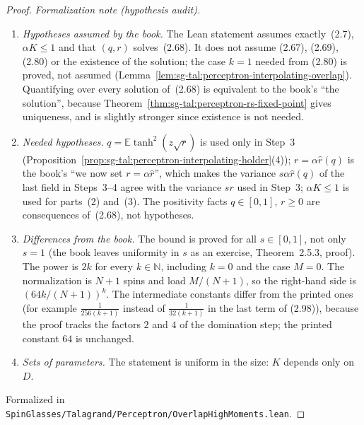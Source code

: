 \begin{proof}
\emph{Formalization note (hypothesis audit).}
\begin{enumerate}
\item \emph{Hypotheses assumed by the book.} The Lean statement assumes exactly~(2.7), $\alpha K\le1$ and that
$(q,r)$ solves~(2.68). It does not assume (2.67), (2.69), (2.80) or the existence of the solution; the case
$k=1$ needed from (2.80) is proved, not assumed
(Lemma~\ref{lem:sg-tal:perceptron-interpolating-overlap}). Quantifying over every solution of~(2.68) is
equivalent to the book's ``the solution'', because Theorem~\ref{thm:sg-tal:perceptron-rs-fixed-point} gives
uniqueness, and is slightly stronger since existence is not needed.
\item \emph{Needed hypotheses.} $q=\mathbb E\tanh^2(z\sqrt r)$ is used only in Step~3
(Proposition~\ref{prop:sg-tal:perceptron-interpolating-holder}(4)); $r=\alpha\widehat r(q)$ is the book's ``we now set $r=\alpha\widehat r$'', which makes the variance
$s\alpha\widehat r(q)$ of the last field in Steps~3--4 agree with the variance $sr$ used in Step~3; $\alpha K\le1$ is used for parts~(2) and~(3). The
positivity facts $q\in[0,1]$, $r\ge0$ are consequences of~(2.68), not hypotheses.
\item \emph{Differences from the book.} The bound is proved for all $s\in[0,1]$, not only $s=1$ (the book
leaves uniformity in $s$ as an exercise, Theorem~2.5.3, proof). The power is $2k$ for every $k\in\mathbb N$,
including $k=0$ and the case $M=0$. The normalization is $N+1$ spins and load $M/(N+1)$, so the right-hand side
is $(64k/(N+1))^k$. The intermediate constants differ from the printed ones (for example $\frac1{256(k+1)}$
instead of $\frac1{32(k+1)}$ in the last term of (2.98)), because the proof tracks the factors $2$ and $4$ of the
domination step; the printed constant $64$ is unchanged.
\item \emph{Sets of parameters.} The statement is uniform in the size: $K$ depends only on $D$.
\end{enumerate}
Formalized in \texttt{SpinGlasses/Talagrand/Perceptron/OverlapHighMoments.lean}.
\end{proof}


